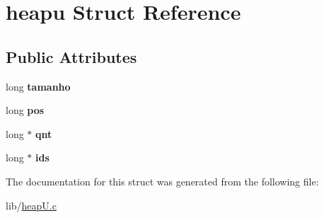 \hypertarget{structheapu}{}\section{heapu Struct Reference}
\label{structheapu}
\subsection*{Public Attributes}
\begin{DoxyCompactItemize}
\item 
long {\bfseries tamanho}\hypertarget{structheapu_ab8d72282b1c88bb0b3ade563554a6406}{}\label{structheapu_ab8d72282b1c88bb0b3ade563554a6406}

\item 
long {\bfseries pos}\hypertarget{structheapu_a608fbc33b10960925a1263da99b2dcdd}{}\label{structheapu_a608fbc33b10960925a1263da99b2dcdd}

\item 
long $\ast$ {\bfseries qnt}\hypertarget{structheapu_a8d50b7cfee48359dab683d3057099398}{}\label{structheapu_a8d50b7cfee48359dab683d3057099398}

\item 
long $\ast$ {\bfseries ids}\hypertarget{structheapu_a214bffde83b4ad51860e610edd675cca}{}\label{structheapu_a214bffde83b4ad51860e610edd675cca}

\end{DoxyCompactItemize}


The documentation for this struct was generated from the following file\+:\begin{DoxyCompactItemize}
\item 
lib/\hyperlink{heapU_8c}{heap\+U.\+c}\end{DoxyCompactItemize}
